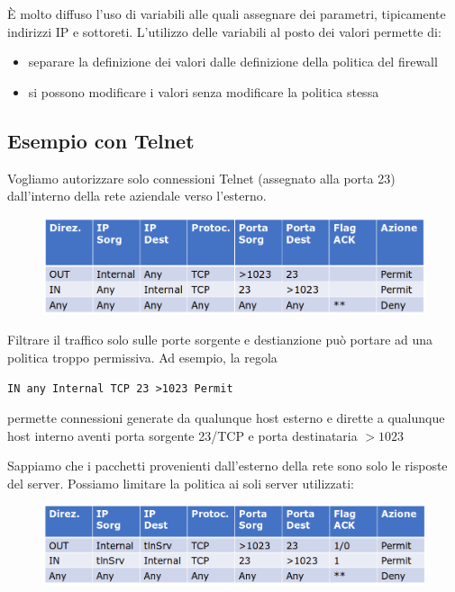 \noindent È molto diffuso l'uso di variabili alle quali assegnare dei parametri, tipicamente indirizzi IP e sottoreti. L'utilizzo delle variabili 
al posto dei valori permette di:
\begin{itemize}
    \item separare la definizione dei valori dalle definizione della politica del firewall
    \item si possono modificare i valori senza modificare la politica stessa
\end{itemize}

\subsection{Esempio con Telnet}
Vogliamo autorizzare solo connessioni Telnet (assegnato alla porta 23) dall'interno della rete aziendale verso 
l'esterno.

\begin{figure}[H]
    \centering
    \includegraphics[width=1\linewidth]{chapters/11/images/telnet1.png}
\end{figure}

\noindent Filtrare il traffico solo sulle porte sorgente e destianzione può 
portare ad una politica troppo permissiva. Ad esempio, la regola 

\begin{center}
    \texttt{IN any Internal TCP 23 >1023 Permit} 
\end{center}

\noindent permette connessioni generate da qualunque host esterno e dirette a qualunque host interno 
aventi porta sorgente 23/TCP e porta destinataria $>1023$

\newpage Sappiamo che i pacchetti provenienti dall'esterno della rete sono solo
le risposte del server. Possiamo limitare la politica ai soli server utilizzati:

\begin{figure}[H]
    \centering
    \includegraphics[width=1\linewidth]{chapters/11/images/telnet2.png}
\end{figure}

